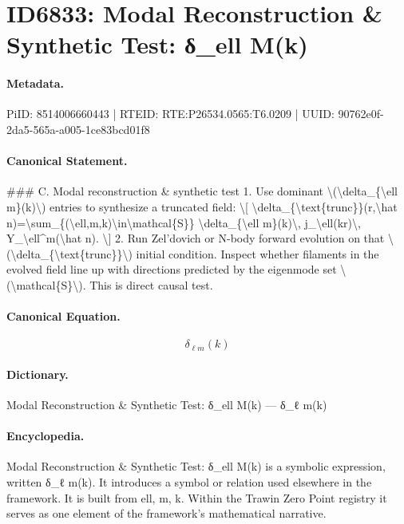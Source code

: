 \section*{ID6833: Modal Reconstruction \& Synthetic Test: δ\_ell M(k)}
\paragraph{Metadata.}
PiID: 8514006660443 | RTEID: RTE:P26534.0565:T6.0209 | UUID: 90762e0f-2da5-565a-a005-1ce83bcd01f8

\paragraph{Canonical Statement.}
\#\#\# C. Modal reconstruction \& synthetic test 1. Use dominant \textbackslash{}(\textbackslash{}delta\_\{\textbackslash{}ell m\}(k)\textbackslash{}) entries to synthesize a truncated field: \textbackslash{}[ \textbackslash{}delta\_\{\textbackslash{}text\{trunc\}\}(r,\textbackslash{}hat n)=\textbackslash{}sum\_\{(\textbackslash{}ell,m,k)\textbackslash{}in\textbackslash{}mathcal\{S\}\} \textbackslash{}delta\_\{\textbackslash{}ell m\}(k)\textbackslash{}, j\_\textbackslash{}ell(kr)\textbackslash{}, Y\_\textbackslash{}ell\textasciicircum{}m(\textbackslash{}hat n). \textbackslash{}] 2. Run Zel’dovich or N-body forward evolution on that \textbackslash{}(\textbackslash{}delta\_\{\textbackslash{}text\{trunc\}\}\textbackslash{}) initial condition. Inspect whether filaments in the evolved field line up with directions predicted by the eigenmode set \textbackslash{}(\textbackslash{}mathcal\{S\}\textbackslash{}). This is direct causal test.

\paragraph{Canonical Equation.}
\[
\delta_{\ell m}(k)
\]

\paragraph{Dictionary.}
Modal Reconstruction \& Synthetic Test: δ\_ell M(k) — δ\_ℓ m(k)

\paragraph{Encyclopedia.}
Modal Reconstruction \& Synthetic Test: δ\_ell M(k) is a symbolic expression, written δ\_ℓ m(k). It introduces a symbol or relation used elsewhere in the framework. It is built from ell, m, k. Within the Trawin Zero Point registry it serves as one element of the framework's mathematical narrative.
